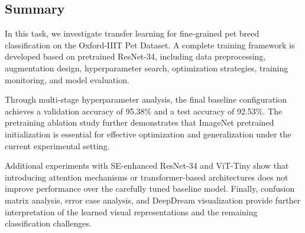 \subsection{Summary}

In this task, we investigate transfer learning for fine-grained pet breed classification on the Oxford-IIIT Pet Dataset. A complete training framework is developed based on pretrained ResNet-34, including data preprocessing, augmentation design, hyperparameter search, optimization strategies, training monitoring, and model evaluation.

Through multi-stage hyperparameter analysis, the final baseline configuration achieves a validation accuracy of 95.38\% and a test accuracy of 92.53\%. The pretraining ablation study further demonstrates that ImageNet pretrained initialization is essential for effective optimization and generalization under the current experimental setting.

Additional experiments with SE-enhanced ResNet-34 and ViT-Tiny show that introducing attention mechanisms or transformer-based architectures does not improve performance over the carefully tuned baseline model. Finally, confusion matrix analysis, error case analysis, and DeepDream visualization provide further interpretation of the learned visual representations and the remaining classification challenges.
